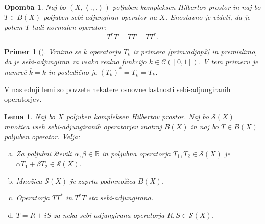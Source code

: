 \documentclass[12pt,a4paper,oneside,fleqn,openany]{book}
\newtheorem{lema}[izrek]{Lema}
\newtheorem{opomba}[izrek]{Opomba}
\newtheorem{primer*}[izrek]{Primer}
\newenvironment{primer}[1][]{\begin{primer*}[#1]\renewcommand*{\qedsymbol}{$\diamondsuit$}\pushQED{\qed}}{\popQED\end{primer*}}
\newcommand{\R}{\mathbb{R}}
\newcommand{\Sp}[2]{\ensuremath{\left<#1, #2\right>}}
\begin{document}
\begin{opomba}
	\label{opomb:sebiadjsonormal}
	Naj bo $(X, \Sp{.}{.})$ poljuben kompleksen Hilbertov prostor in naj bo $T\in B(X)$ poljuben sebi-adjungiran operator na $X$. Enostavno je videti, da je potem $T$ tudi normalen operator: $$T^*T = TT = TT^*.$$
\end{opomba}

\begin{primer}
	\label{prim:sebiadjop}
	Vrnimo se k operatorju $T_k$ iz primera \ref{prim:adjop2} in premislimo, da je sebi-adjungiran za vsako realno funkcijo $k\in\mathcal{C}([0, 1])$. V tem primeru je namreč $\overline{k} = k$ in posledično je $(T_k)^* = T_{\overline{k}} = T_k$.
	
\end{primer}

V naslednji lemi so povzete nekatere osnovne lastnosti sebi-adjungiranih operatorjev.

\begin{lema}
	\label{lem:sebiadjlast}
	Naj bo $X$ poljuben kompleksen Hilbertov prostor. Naj bo $\mathcal{S}(X)$ množica vseh sebi-adjungiranih operatorjev znotraj $B(X)$ in naj bo $T\in B(X)$ poljuben operator. Velja:
	\begin{enumerate}[a)]
		\item Za poljubni števili $\alpha, \beta \in \R$ in poljubna operatorja $T_1, T_2 \in \mathcal{S}(X)$ je $\alpha T_1 + \beta T_2 \in \mathcal{S}(X)$.
		\item Množica $\mathcal{S}(X)$ je zaprta podmnožica $B(X)$.
		\item Operatorja $TT^*$ in $T^*T$ sta sebi-adjungirana.
		\item $T = R + iS$ za neka sebi-adjungirana operatorja $R, S \in \mathcal{S}(X)$.
	\end{enumerate}
\end{lema}
\end{document}
